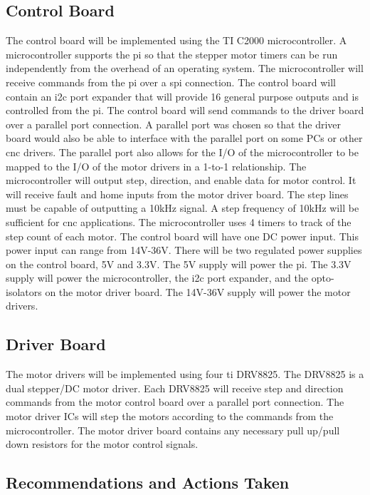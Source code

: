 \subsection{Control Board}
The control board will be implemented using the TI C2000 microcontroller.
A microcontroller supports the \gls{pi} so that the stepper motor timers can be run independently from the overhead of an operating system.
The microcontroller will receive commands from the \gls{pi} over a \gls{spi} connection.
The control board will contain an \gls{i2c} port expander that will provide 16 general purpose outputs and is controlled from the \gls{pi}.
The control board will send commands to the driver board over a parallel port connection.
A parallel port was chosen so that the driver board would also be able to interface with the parallel port on some PCs or other \gls{cnc} drivers.
The parallel port also allows for the I/O of the microcontroller to be mapped to the I/O of the motor drivers in a 1-to-1 relationship.
The microcontroller will output step, direction, and enable data for motor control.
It will receive fault and home inputs from the motor driver board.
The step lines must be capable of outputting a 10kHz signal.
A step frequency of 10kHz will be sufficient for \gls{cnc} applications.
The microcontroller uses 4 timers to track of the step count of each motor. 
The control board will have one DC power input.
This power input can range from 14V-36V.
There will be two regulated power supplies on the control board, 5V and 3.3V.
The 5V supply will power the \gls{pi}.
The 3.3V supply will power the microcontroller, the \gls{i2c} port expander, and the opto-isolators on the motor driver board.
The 14V-36V supply will power the motor drivers.

\subsection{Driver Board}
The motor drivers will be implemented using four \gls{ti} DRV8825.
The DRV8825 is a dual stepper/DC motor driver.
Each DRV8825 will receive step and direction commands from the motor control board over a parallel port connection.
The motor driver ICs will step the motors according to the commands from the microcontroller.
The motor driver board contains any necessary pull up/pull down resistors for the motor control signals.

\subsection{Recommendations and Actions Taken}
